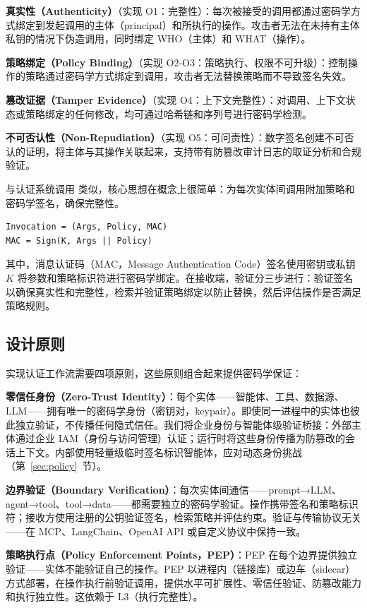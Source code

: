 \textbf{真实性（Authenticity）}（实现 O1：完整性）：每次被接受的调用都通过密码学方式绑定到发起调用的主体（principal）和所执行的操作。攻击者无法在未持有主体私钥的情况下伪造调用，同时绑定 WHO（主体）和 WHAT（操作）。

\textbf{策略绑定（Policy Binding）}（实现 O2-O3：策略执行、权限不可升级）：控制操作的策略通过密码学方式绑定到调用，攻击者无法替换策略而不导致签名失效。

\textbf{篡改证据（Tamper Evidence）}（实现 O4：上下文完整性）：对调用、上下文状态或策略绑定的任何修改，均可通过哈希链和序列号进行密码学检测。

\textbf{不可否认性（Non-Repudiation）}（实现 O5：可问责性）：数字签名创建不可否认的证明，将主体与其操作关联起来，支持带有防篡改审计日志的取证分析和合规验证。

与认证系统调用 \cite{rajagopalan2006,erlingsson2004} 类似，核心思想在概念上很简单：为每次实体间调用附加策略和密码学签名，确保完整性。
{\small
\begin{verbatim}
Invocation = (Args, Policy, MAC)
MAC = Sign(K, Args || Policy)
\end{verbatim}
}
其中，消息认证码（MAC，Message Authentication Code）签名使用密钥或私钥 $K$ 将参数和策略标识符进行密码学绑定。在接收端，验证分三步进行：验证签名以确保真实性和完整性，检索并验证策略绑定以防止替换，然后评估操作是否满足策略规则。

\subsection{设计原则}

实现认证工作流需要四项原则，这些原则组合起来提供密码学保证：

\textbf{零信任身份（Zero-Trust Identity）}：每个实体——智能体、工具、数据源、LLM——拥有唯一的密码学身份（密钥对，keypair）。即使同一进程中的实体也彼此独立验证，不传播任何隐式信任。我们将企业身份与智能体级验证桥接：外部主体通过企业 IAM（身份与访问管理）认证；运行时将这些身份传播为防篡改的会话上下文。内部使用轻量级临时签名标识智能体，应对动态身份挑战（第~\ref{sec:policy}~节）。

\textbf{边界验证（Boundary Verification）}：每次实体间通信——prompt→LLM、agent→tool、tool→data——都需要独立的密码学验证。操作携带签名和策略标识符；接收方使用注册的公钥验证签名，检索策略并评估约束。验证与传输协议无关——在 MCP、LangChain、OpenAI API 或自定义协议中保持一致。

\textbf{策略执行点（Policy Enforcement Points，PEP）}：PEP 在每个边界提供独立验证——实体不能验证自己的操作。PEP 以进程内（链接库）或边车（sidecar）方式部署，在操作执行前验证调用，提供水平可扩展性、零信任验证、防篡改能力和执行独立性。这依赖于 L3（执行完整性）。

